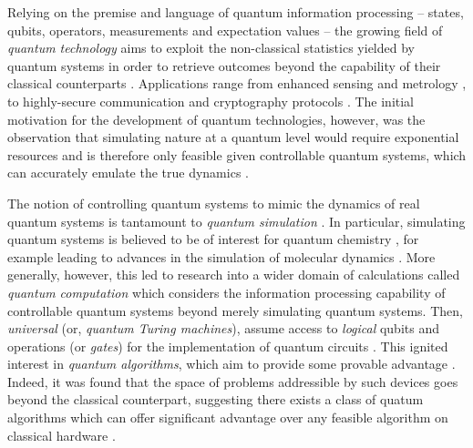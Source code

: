 {Relying on the premise and language of quantum information processing 
    -- states, qubits, operators, measurements and expectation values -- 
    the growing field of \emph{quantum technology} aims to exploit the 
    non-classical statistics yielded by quantum systems in order to retrieve 
    outcomes beyond the capability of their classical counterparts \cite{dowling2003quantum}. 
Applications range from enhanced sensing and metrology \cite{giovannetti2004quantum, giovannetti2011advances}, 
    to highly-secure communication and cryptography protocols \cite{bennett2020quantum, ekert1991quantum, gisin2002quantum}.
The initial motivation for the development of quantum technologies, however, 
    was the  observation that simulating nature at a quantum level would require 
    exponential resources and is therefore only feasible given controllable quantum systems,
    which can accurately emulate the true dynamics \cite{manin1980vychislimoe, benioff1980computer, benioff1982quantum, feynman1982simulating}. 

\par 
The notion of controlling quantum systems to mimic the dynamics of real quantum systems is tantamount to 
    \emph{quantum simulation} \cite{lloyd1996universal, cirac2012goals}. 
In particular, simulating quantum systems is believed to be of interest for quantum chemistry \cite{lanyon2010towards, cao2019quantum, mcardle2020quantum}, 
    for example leading to advances in the simulation of molecular dynamics \cite{aspuru2005simulated, sparrow2018simulating}.
More generally, however, this led to research into a wider domain of calculations called \emph{quantum computation}
    which considers the information processing capability of controllable quantum systems beyond merely simulating quantum systems. 
Then, \emph{universal } (or, \emph{quantum Turing machines}), 
    assume access to \emph{logical} qubits and operations (or \emph{gates}) for the implementation of quantum circuits \cite{deutsch1985quantum}. 
This ignited interest in \emph{quantum algorithms}, which aim to provide some provable advantage 
    \cite{simon1997power, bennett1997strengths, bernstein1997quantum, grover1997quantum, shor1999polynomial}.
Indeed, it was found that the space of problems addressible by such devices
    goes beyond the classical counterpart,
    suggesting there exists a class of quatum algorithms which can offer significant advantage over 
    any feasible algorithm on classical hardware \cite{watrous2008quantum}. 
\par 

}
